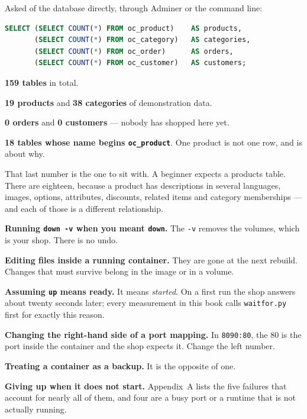 \begin{examplebox}
Asked of the database directly, through Adminer or the command line:

\begin{lstlisting}[language=sql]
SELECT (SELECT COUNT(*) FROM oc_product)    AS products,
       (SELECT COUNT(*) FROM oc_category)   AS categories,
       (SELECT COUNT(*) FROM oc_order)      AS orders,
       (SELECT COUNT(*) FROM oc_customer)   AS customers;
\end{lstlisting}

\begin{tight}
  \item \textbf{159 tables} in total.
  \item \textbf{19 products} and \textbf{38 categories} of demonstration data.
  \item \textbf{0 orders} and \textbf{0 customers} --- nobody has shopped here
        yet.
  \item \textbf{18 tables whose name begins \texttt{oc\_product}}. One product
        is not one row, and  is about why.
\end{tight}

\smallskip
That last number is the one to sit with. A beginner expects a products table.
There are eighteen, because a product has descriptions in several languages,
images, options, attributes, discounts, related items and category memberships
--- and each of those is a different relationship.
\end{examplebox}

\begin{pitfall}
\begin{tight}
  \item \textbf{Running \texttt{down -v} when you meant \texttt{down}.} The
        \texttt{-v} removes the volumes, which is your shop. There is no undo.
  \item \textbf{Editing files inside a running container.} They are gone at the
        next rebuild. Changes that must survive belong in the image or in a
        volume.
  \item \textbf{Assuming \texttt{up} means ready.} It means \emph{started}.
        On a first run the shop answers about twenty seconds later; every
        measurement in this book calls \texttt{waitfor.py} first for exactly
        this reason.
  \item \textbf{Changing the right-hand side of a port mapping.} In
        \texttt{8090:80}, the 80 is the port inside the container and the shop
        expects it. Change the left number.
  \item \textbf{Treating a container as a backup.} It is the opposite of one.
  \item \textbf{Giving up when it does not start.} Appendix~A lists the five
        failures that account for nearly all of them, and four are a busy port
        or a runtime that is not actually running.
\end{tight}
\end{pitfall}


